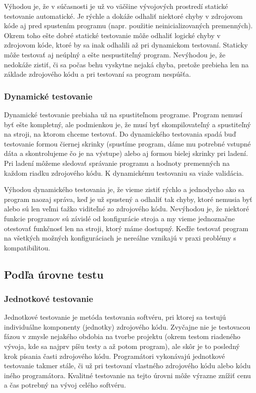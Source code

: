 \documentclass[11pt,twoside,slovak,a4paper]{article}
\begin{document}
			Výhodou je, že v súčasnosti je už vo väčšine vývojových prostredí statické testovanie automatické. Je rýchle a dokáže odhaliť niektoré chyby v zdrojovom kóde aj pred spustením programu (napr. použitie neinicializovaných premenných). Okrem toho ešte dobré statické testovanie môže odhaliť logické chyby v zdrojovom kóde, ktoré by sa inak odhalili až pri dynamickom testovaní. Staticky môže testovať aj neúplný a ešte nespustiteľný program.
			Nevýhodou je, že nedokáže zistiť, či sa počas behu vyskytne nejaká chyba, pretože prebieha len na základe zdrojového kódu a pri testovaní sa program nespúšťa.
			
		\subsubsection{Dynamické testovanie}
			Dynamické testovanie prebiaha už na spustiteľnom programe. Program nemusí byť ešte kompletný, ale podmienkou je, že musí byť skompilovateľný a spustiteľný na stroji, na ktorom chceme testovať. Do dynamického testovania spadá buď testovanie formou čiernej skrinky (spustíme program, dáme mu potrebné vstupné dáta a skontrolujeme čo je na výstupe) alebo aj formou bielej skrinky pri ladení. Pri ladení môžeme sledovať správanie programu a hodnoty premenných na každom riadku zdrojového kódu. K dynamickému testovaniu sa viaže validácia.
			
			Výhodou dynamického testovania je, že vieme zistiť rýchlo a jednodycho ako sa program naozaj správa, keď je už spustený a odhaliť tak chyby, ktoré nemusia byť alebo sú len veľmi ťažko viditeľné zo zdrojového kódu.
			Nevýhodou je, že niektoré funkcie programov sú závislé od konfigurácie stroja a my vieme jednoznačne otestovať funkčnosť len na stroji, ktorý máme dostupný. Keďže testovať program na všetkých možných konfiguráciach je nereálne vznikajú v praxi problémy s kompatibilitou.
	
	\subsection{Podľa úrovne testu}
		\subsubsection{Jednotkové testovanie} 
		
			Jednotkové testovanie je metóda testovania softvéru, pri ktorej sa testujú individuálne komponenty (jednotky) zdrojového kódu. Zvyčajne nie je testovacou fázou v zmysle nejakého obdobia na tvorbe projektu (okrem testom riadeného vývoja, kde sa najprv píšu testy a až potom program), ale skôr je to posledný krok písania časti zdrojového kódu. Programátori vykonávajú jednotkové testovanie takmer stále, či už pri testovaní vlastného zdrojového kódu alebo kódu iného programátora\cite{Alba2008}. Kvalitné testovanie na tejto úrovni môže výrazne znížiť cenu a čas potrebný na vývoj celého softvéru\cite{EST2002}.
\end{document}
